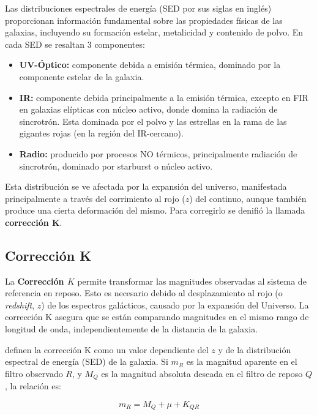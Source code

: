 \documentclass[twocolumn]{article}
\begin{document}
Las distribuciones espectrales de energía (SED por sus siglas en inglés)  proporcionan información fundamental sobre las propiedades físicas de las galaxias, incluyendo su formación estelar, metalicidad y contenido de polvo. En cada SED se resaltan 3 componentes: 
\begin{itemize}
\item \textbf{UV-Óptico: }componente debida a emisión térmica, dominado por la componente estelar de la galaxia.

\item \textbf{IR: }componente debida principalmente a la emisión térmica, excepto en FIR en galaxias elípticas con núcleo activo, donde domina la radiación de sincrotrón. Esta dominada por el polvo y las estrellas en la rama de las gigantes rojas (en la región del IR-cercano).

\item \textbf{Radio: }producido por procesos NO térmicos, principalmente radiación de sincrotrón, dominado por starburst o núcleo activo.
\end{itemize}

Esta distribución se ve afectada por la expansión del universo, manifestada principalmente a través del corrimiento al rojo ($z$) del continuo, aunque también produce una cierta deformación del mismo.
Para corregirlo se denifió la llamada \textbf{corrección K}.



\subsection{Corrección K}

La \textbf{Corrección $K$} permite transformar las magnitudes observadas al sistema de referencia en reposo. Esto es necesario debido al desplazamiento al rojo (o \textit{redshift}, $z$) de los espectros galácticos, causado por la expansión del Universo. La corrección K asegura que se están comparando magnitudes en el mismo rango de longitud de onda, independientemente de la distancia de la galaxia.

\citet{Hogg2002} definen la corrección K como un valor dependiente del $z$ y de la distribución espectral de energía (SED) de la galaxia. Si $m_R$ es la magnitud aparente en el filtro observado $R$, y $M_Q$ es la magnitud absoluta deseada en el filtro de reposo $Q$, la relación es:

\begin{equation}
m_R = M_Q + \mu + K_{QR}
\label{eq:Kcorr}
\end{equation}
\end{document}
